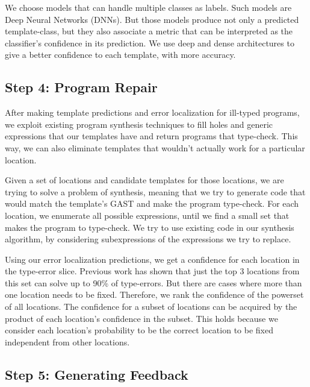  We choose models that can handle multiple
classes as labels. Such models are Deep Neural Networks (DNNs). But those models
produce not only a predicted template-class, but they also associate a metric
that can be interpreted as the classifier’s confidence in its prediction. We use
deep and dense architectures to give a better confidence to each template, with
more accuracy.



\subsection{Step 4: Program Repair}
\label{subsec:step4}

After making template predictions and error localization for ill-typed programs,
we exploit existing program synthesis techniques to fill holes and generic
expressions that our templates have and return programs that type-check. This
way, we can also eliminate templates that wouldn’t actually work for a
particular location.

 Given a set of locations and candidate templates for
those locations, we are trying to solve a problem of synthesis, meaning that we
try to generate code that would match the template’s GAST and make the program
type-check. For each location, we enumerate all possible expressions, until we
find a small set that makes the program to type-check. We try to use existing
code in our synthesis algorithm, by considering subexpressions of the
expressions we try to replace.

 Using our error localization
predictions, we get a confidence for each location in the type-error slice.
Previous work has shown that just the top 3 locations from this set can solve up
to 90\% of type-errors. But there are cases where more than one location needs
to be fixed. Therefore, we rank the confidence of the powerset of all locations.
The confidence for a subset of locations can be acquired by the product of each
location’s confidence in the subset. This holds because we consider each
location’s probability to be the correct location to be fixed independent from
other locations.



\subsection{Step 5: Generating Feedback}
\label{subsec:step5}


